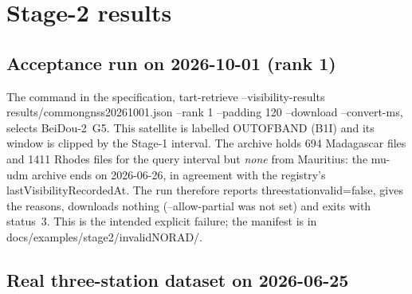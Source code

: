 \documentclass[11pt,a4paper]{article}
\newcommand{\code}[1]{{\ttfamily\def\_{\textunderscore\allowbreak}#1}}
\begin{document}
\section{Stage-2 results}

\subsection{Acceptance run on 2026-10-01 (rank 1)}

The command in the specification,
\code{tart-retrieve --visibility-results results/common\_gnss\_20261001.json
--rank 1 --padding 120 --download --convert-ms}, selects BeiDou-2~G5. This
satellite is labelled \code{OUT\_OF\_BAND} (B1I) and its window is clipped
by the Stage-1 interval. The archive holds 694 Madagascar files and 1411
Rhodes files for the query interval but \emph{none} from Mauritius: the
\code{mu-udm} archive ends on 2026-06-26, in agreement with the registry's
\code{lastVisibilityRecordedAt}. The run therefore reports
\code{three\_station\_valid=false}, gives the reasons, downloads nothing
(\code{--allow-partial} was not set) and exits with status~3. This is the
intended explicit failure; the manifest is in
\code{docs/examples/stage2/invalid\_20261001\_NORAD\_38091/}.

\subsection{Real three-station dataset on 2026-06-25}
\end{document}
